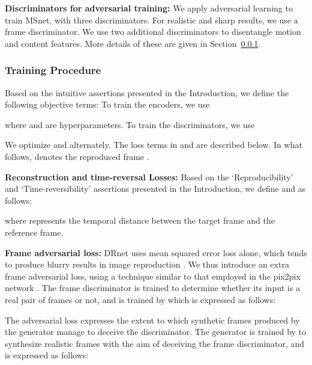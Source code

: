 \textbf{Discriminators for adversarial training: }We apply adversarial learning to train MSnet, with three discriminators. For realistic and sharp results, we use a frame discriminator. We use two additional discriminators to disentangle motion and content features. More details of these are given in Section~\ref{trainingprocedure}.


\subsubsection{Training Procedure}\label{trainingprocedure}

Based on the intuitive assertions presented in the Introduction, we define the following objective terms: To train the encoders, we use
\vspace{-3pt}

where  and  are hyperparameters. To train the discriminators, we use

We optimize  and  alternately. The loss terms in  and  are described below. In what follows,  denotes the reproduced frame .

\textbf{Reconstruction and time-reversal Losses: }
Based on the `Reproducibility' and `Time-reversibility' assertions presented in the Introduction, we define  and  as follows:

\vspace{-7pt}

where  represents the temporal distance between the target frame and the reference frame.


\textbf{Frame adversarial loss: }
DRnet \cite{denton2017unsupervised} uses mean squared error loss alone, which tends to produce blurry results in image reproduction \cite{mathieu2015deep}. We thus introduce an extra frame adversarial loss, using a technique similar to that employed in the pix2pix network \cite{isola2017image}.
The frame discriminator  is trained to determine whether its input is a real pair of frames or not, and  is trained by  which is expressed as follows: 

The adversarial loss  expresses the extent to which synthetic frames produced by the generator  manage to deceive the discriminator. The generator  is trained by  to synthesize realistic frames with the aim of deceiving the frame discriminator, and  is expressed as follows:




